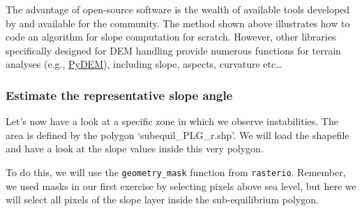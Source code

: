 \documentclass[
  letterpaper,
  DIV=11,
  numbers=noendperiod]{scrartcl}
\begin{document}
\begin{tcolorbox}[enhanced jigsaw, arc=.35mm, left=2mm, toprule=.15mm, colbacktitle=quarto-callout-tip-color!10!white, toptitle=1mm, breakable, opacityback=0, rightrule=.15mm, title=\textcolor{quarto-callout-tip-color}{\faLightbulb}\hspace{0.5em}{Python libraries}, colframe=quarto-callout-tip-color-frame, bottomrule=.15mm, colback=white, opacitybacktitle=0.6, bottomtitle=1mm, titlerule=0mm, coltitle=black, leftrule=.75mm]

The advantage of open-source software is the wealth of available tools
developed by and available for the community. The method shown above
illustrates how to code an algorithm for slope computation for scratch.
However, other libraries specifically designed for DEM handling provide
numerous functions for terrain analyses (e.g.,
\href{https://github.com/creare-com/pydem}{PyDEM}), including slope,
aspects, curvature etc\ldots{}

\end{tcolorbox}

\subsubsection{Estimate the representative slope
angle}\label{estimate-the-representative-slope-angle}

Let's now have a look at a specific zone in which we observe
instabilities. The area is defined by the polygon
`subequil\_PLG\_r.shp'. We will load the shapefile and have a look at
the slope values inside this very polygon.

To do this, we will use the \texttt{geometry\_mask} function from
\texttt{rasterio}. Remember, we used masks in our first exercise by
selecting pixels above sea level, but here we will select all pixels of
the slope layer inside the sub-equilibrium polygon.
\end{document}
